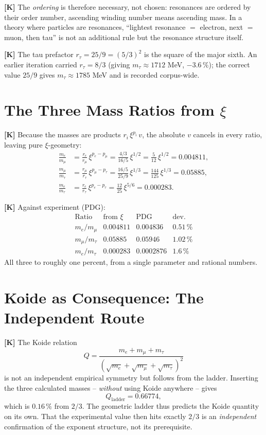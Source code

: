 \textbf{[K]} The \emph{ordering} is therefore necessary, not chosen: resonances
are ordered by their order number, ascending winding number means
ascending mass. In a theory where particles are resonances,
``lightest resonance $=$ electron, next $=$ muon, then tau'' is not
an additional rule but the resonance structure itself.

\textbf{[K]} The tau prefactor $r_\tau = 25/9 = (5/3)^2$ is the square of the
major sixth. An earlier iteration carried $r_\tau = 8/3$ (giving
$m_\tau\approx1712$ MeV, $-3{.}6\,\%$); the correct value $25/9$ gives
$m_\tau\approx1785$ MeV and is recorded corpus-wide.

\section{The Three Mass Ratios from $\xi$}

\textbf{[K]} Because the masses are products $r_i\,\xi^{p_i}\,v$, the
absolute $v$ cancels in every ratio, leaving pure $\xi$-geometry:
\begin{align*}
  \frac{m_e}{m_\mu} &= \frac{r_e}{r_\mu}\,\xi^{p_e-p_\mu}
    = \frac{4/3}{16/5}\,\xi^{1/2} = \frac{5}{12}\,\xi^{1/2} = 0{.}004811, \\
  \frac{m_\mu}{m_\tau} &= \frac{r_\mu}{r_\tau}\,\xi^{p_\mu-p_\tau}
    = \frac{16/5}{25/9}\,\xi^{1/3} = \frac{144}{125}\,\xi^{1/3} = 0{.}05885, \\
  \frac{m_e}{m_\tau} &= \frac{r_e}{r_\tau}\,\xi^{p_e-p_\tau}
    = \frac{12}{25}\,\xi^{5/6} = 0{.}000283.
\end{align*}

\textbf{[K]} Against experiment (PDG):
\[
  \begin{array}{lccc}
    \text{Ratio} & \text{from } \xi & \text{PDG} & \text{dev.} \\[2pt]
    m_e/m_\mu   & 0{.}004811 & 0{.}004836 & 0{.}51\,\% \\
    m_\mu/m_\tau & 0{.}05885 & 0{.}05946 & 1{.}02\,\% \\
    m_e/m_\tau  & 0{.}000283 & 0{.}0002876 & 1{.}6\,\%
  \end{array}
\]
All three to roughly one percent, from a single parameter and rational numbers.

\section{Koide as Consequence: The Independent Route}

\textbf{[K]} The Koide relation
\[
  Q = \frac{m_e+m_\mu+m_\tau}{(\sqrt{m_e}+\sqrt{m_\mu}+\sqrt{m_\tau})^2}
\]
is not an independent empirical symmetry but follows from the ladder. Inserting
the three calculated masses -- \emph{without} using Koide anywhere --
gives
\[
  Q_\text{ladder} = 0{.}66774,
\]
which is $0{.}16\,\%$ from $2/3$. The geometric ladder thus predicts the
Koide quantity on its own. That the experimental value then hits exactly $2/3$
is an \emph{independent} confirmation of the exponent structure, not its
prerequisite.

